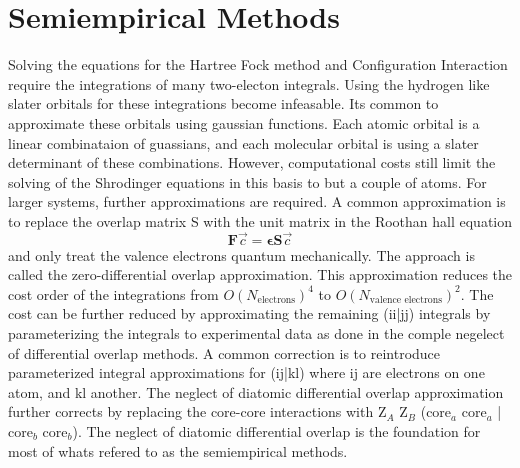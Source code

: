 \section{Semiempirical Methods}
Solving the equations for the Hartree Fock method and Configuration Interaction require the integrations of many two-electon integrals.
Using the hydrogen like slater orbitals for these integrations become infeasable.
Its common to approximate these orbitals using gaussian functions.
Each atomic orbital is a linear combinataion of guassians, and each molecular orbital is using a slater determinant of these combinations.
However, computational costs still limit the solving of the Shrodinger equations in this basis to but a couple of atoms.
For larger systems, further approximations are required.
A common approximation is to replace the overlap matrix S with the unit matrix in the Roothan hall equation
\begin{equation}
\mathbf{F} \vec{c} = \bm{\epsilon}\mathbf{S}\vec{c}
\end{equation}
and only treat the valence electrons quantum mechanically. \cite{christensen2016semiempirical}
The approach is called the zero-differential overlap approximation.
This approximation reduces the cost order of the integrations from \(O(N_{\text{electrons}})^4\) to \(O(N_{\text{valence electrons}})^2\).
The cost can be further reduced by approximating the remaining (ii|jj) integrals by parameterizing the integrals to experimental data as done in the comple negelect of differential overlap methods.
A common correction is to reintroduce parameterized integral approximations for (ij|kl) where ij are electrons on one atom, and kl another. \cite{pople1965approximate}
The neglect of diatomic differential overlap approximation further corrects by replacing the core-core interactions with Z\(_A\) Z\(_B\) (core\(_a\) core\(_a\) | core\(_b\) core\(_b\)).
The neglect of diatomic differential overlap is the foundation for most of whats refered to as the semiempirical methods.

